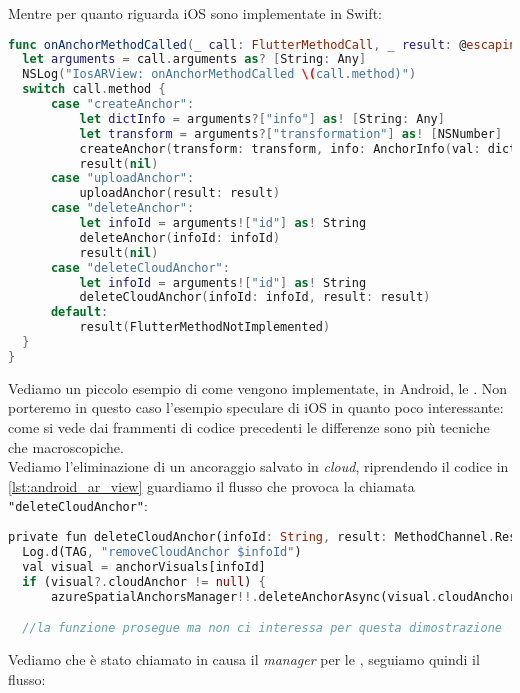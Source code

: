Mentre per quanto riguarda iOS sono implementate in Swift:

\begin{lstlisting}[language=swift, label={lst:ios_channels}, firstnumber=1,caption={iOS chiamate dei \textit{method channel} per effettuare \textit{create, delete, ulpoad, delete cloud anchor}}]
func onAnchorMethodCalled(_ call: FlutterMethodCall, _ result: @escaping FlutterResult) {
  let arguments = call.arguments as? [String: Any]
  NSLog("IosARView: onAnchorMethodCalled \(call.method)")
  switch call.method {
      case "createAnchor":
          let dictInfo = arguments?["info"] as! [String: Any]
          let transform = arguments?["transformation"] as! [NSNumber]
          createAnchor(transform: transform, info: AnchorInfo(val: dictInfo))
          result(nil)
      case "uploadAnchor":
          uploadAnchor(result: result)
      case "deleteAnchor":
          let infoId = arguments!["id"] as! String
          deleteAnchor(infoId: infoId)
          result(nil)
      case "deleteCloudAnchor":
          let infoId = arguments!["id"] as! String
          deleteCloudAnchor(infoId: infoId, result: result)
      default:
          result(FlutterMethodNotImplemented)
  }
}
\end{lstlisting}

Vediamo un piccolo esempio di come vengono implementate, in Android, le \asa{}. Non porteremo in questo caso l'esempio speculare di iOS in quanto poco interessante: come si vede dai frammenti di codice precedenti le differenze sono più tecniche che macroscopiche.\\
Vediamo l'eliminazione di un ancoraggio salvato in \textit{cloud}, riprendendo il codice in \ref{lst:android_ar_view} guardiamo il flusso che provoca la chiamata \verb+"deleteCloudAnchor"+:

\begin{lstlisting}[language=dart, label={lst:asa_android_call}, firstnumber=1,caption={Eliminazione \textit{cloud anchor} lato Android, chiamata}]
private fun deleteCloudAnchor(infoId: String, result: MethodChannel.Result) {
  Log.d(TAG, "removeCloudAnchor $infoId")
  val visual = anchorVisuals[infoId]
  if (visual?.cloudAnchor != null) {
      azureSpatialAnchorsManager!!.deleteAnchorAsync(visual.cloudAnchor!!)

  //la funzione prosegue ma non ci interessa per questa dimostrazione
\end{lstlisting}

Vediamo che è stato chiamato in causa il \textit{manager} per le \asa{}, seguiamo quindi il flusso:

